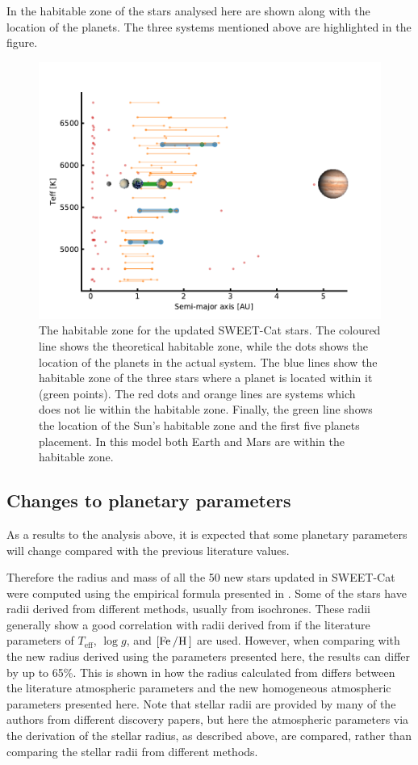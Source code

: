 In  the habitable zone of the stars analysed here are shown along with the location of
the planets. The three systems mentioned above are highlighted in the figure.

\begin{figure}[htpb!]
    \centering
    \includegraphics[width=0.8\linewidth]{figures/HZ.pdf}
    \caption{The habitable zone for the updated SWEET-Cat stars. The coloured line shows the
             theoretical habitable zone, while the dots shows the location of the planets in the
             actual system. The blue lines show the habitable zone of the three stars where a planet
             is located within it (green points). The red dots and orange lines are systems which
             does not lie within the habitable zone. Finally, the green line shows the location of
             the Sun's habitable zone and the first five planets placement. In this model both Earth
             and Mars are within the habitable zone.}
    \label{fig:HZ}
\end{figure}



\subsection{Changes to planetary parameters}

As a results to the analysis above, it is expected that some planetary parameters will change
compared with the previous literature values.

Therefore the radius and mass of all the 50 new stars updated in SWEET-Cat were computed using the
empirical formula presented in \citet{Torres2010}. Some of the stars have radii derived from
different methods, usually from isochrones. These radii generally show a good correlation with radii
derived from \citet{Torres2010} if the literature parameters of $T_\mathrm{eff}$, $\log g$, and
$[\ion{Fe}/\ion{H}]$ are used. However, when comparing with the new radius derived using the
parameters presented here, the results can differ by up to 65\%. This is shown in  how
the radius calculated from \citet{Torres2010} differs between the literature atmospheric parameters
and the new homogeneous atmospheric parameters presented here. Note that stellar radii are provided
by many of the authors from different discovery papers, but here the atmospheric parameters via the
derivation of the stellar radius, as described above, are compared, rather than comparing the
stellar radii from different methods.

